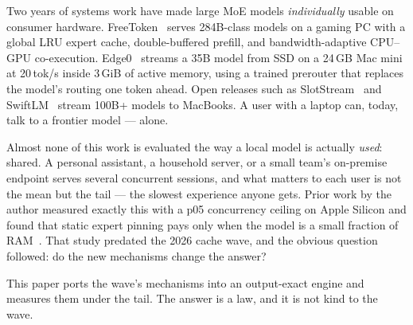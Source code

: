 \documentclass[11pt]{article}
\begin{document}
Two years of systems work have made large MoE models \emph{individually}
usable on consumer hardware. FreeToken~\cite{freetoken} serves 284B-class
models on a gaming PC with a global LRU expert cache, double-buffered
prefill, and bandwidth-adaptive CPU--GPU co-execution. Edge0~\cite{edge0}
streams a 35B model from SSD on a 24\,GB Mac mini at 20\,tok/s inside
3\,GiB of active memory, using a trained prerouter that replaces the model's
routing one token ahead. Open releases such as SlotStream~\cite{slotstream}
and SwiftLM~\cite{swiftlm} stream 100B+ models to MacBooks. A user with a
laptop can, today, talk to a frontier model --- alone.

Almost none of this work is evaluated the way a local model is actually
\emph{used}: shared. A personal assistant, a household server, or a small
team's on-premise endpoint serves several concurrent sessions, and what
matters to each user is not the mean but the tail --- the slowest experience
anyone gets. Prior work by the author measured exactly this with a p05
concurrency ceiling on Apple Silicon and found that static expert pinning
pays only when the model is a small fraction of RAM~\cite{hariri2026pinning}.
That study predated the 2026 cache wave, and the obvious question followed:
do the new mechanisms change the answer?

This paper ports the wave's mechanisms into an output-exact engine and
measures them under the tail. The answer is a law, and it is not kind to
the wave.
\end{document}
